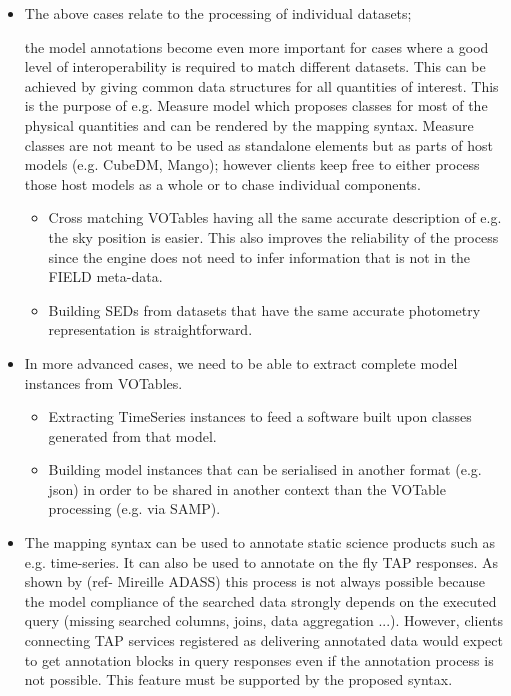 \begin{itemize}
  \item The above cases relate to the processing of individual datasets; 
  
  the model annotations become even more important for cases where a good level of interoperability is required to match different datasets. 
           This can be achieved by giving  common data structures for all quantities of interest. This is the purpose of e.g. Measure model which proposes classes for 
           most of the physical quantities and can be rendered by the mapping syntax. Measure classes are not meant to be used as standalone elements but as parts of host models (e.g. CubeDM, Mango);
           however clients keep free to either process those host models as a whole or to chase individual components.
    \begin{itemize}
      \item Cross matching VOTables having all the same accurate description of e.g. the sky position is easier. %
               This also improves the reliability of the process since the engine does not need to infer information that is not in the FIELD meta-data.
      \item Building SEDs from datasets that have the same accurate photometry representation is straightforward.
   \end{itemize}          

  \item In more advanced cases, we need to be able to extract complete model instances from VOTables.
    \begin{itemize}
      \item Extracting  TimeSeries instances to feed a software built upon classes generated from that model.
      \item Building model instances that can be serialised in another format (e.g. json) in order to be shared in another context than the VOTable processing (e.g. via SAMP).
   \end{itemize}         
    
   \item The mapping syntax can be used to annotate static science products such as e.g. time-series. It can also be used to annotate on the fly TAP responses.
   As shown by (ref- Mireille ADASS) this process is not always possible because the model compliance of the searched data strongly depends on the executed query (missing searched columns, joins, data aggregation ...). 
   However, clients connecting TAP services registered as delivering annotated data would expect to get annotation blocks in query responses even if the annotation process is not possible. 
   This feature must be supported by the proposed syntax.
    
\end{itemize} 

